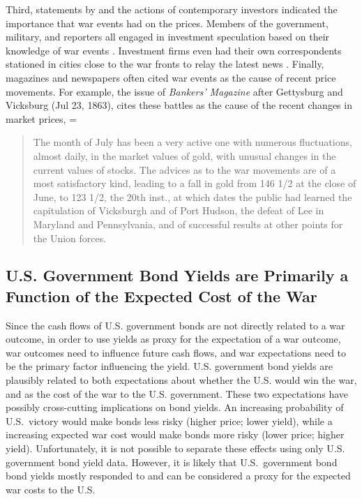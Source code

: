 Third, statements by and the actions of contemporary investors indicated the importance that war events had on the prices. %
Members of the government, military, and reporters all engaged in investment speculation based on their knowledge of war events \parencites[5-7]{Cornwallis1879}{Mitchell1903}[][1004]{WillardGuinnaneEtAl1996}.
Investment firms even had their own correspondents stationed in cities close to the war fronts to relay the latest news \parencites[5-7]{Cornwallis1879}. %
Finally, magazines and newspapers often cited war events as the cause of recent price movements. %
For example, the issue of \textit{Bankers' Magazine} after Gettysburg and Vicksburg (Jul 23, 1863), cites these battles as the cause of the recent changes in market prices,
=\begin{quote}
  The month of July has been a very active one with numerous fluctuations, almost daily, in the market values of gold, with unusual changes in the current values of stocks. %
  The advices as to the war movements are of a most satisfactory kind, leading to a fall in gold from 146 1/2 at the close of June, to 123 1/2, the 20th inst., at which dates the public had learned the  capitulation of Vicksburgh and of Port Hudson, the defeat of Lee in  Maryland and Pennsylvania, and of successful results at other points  for the Union forces. %
\parencite[159]{BankersMagazine1864}
\end{quote}



\subsection{U.S. Government Bond Yields are Primarily a Function of the Expected Cost of the War}
\label{sec:u.s.-governm-inter}

Since the cash flows of U.S. government bonds are not directly related to a war outcome, in order to use yields as proxy for the expectation of a war outcome, war outcomes need to influence future cash flows, and war expectations need to be the primary factor influencing the yield.
U.S. government bond yields are plausibly related to both expectations about whether the U.S. would win the war, and as the cost of the war to the U.S. government.
These two expectations have possibly cross-cutting implications on bond yields.
An increasing probability of U.S.\ victory would make bonds less risky (higher price; lower yield), while a increasing expected war cost would make bonds more risky (lower price; higher yield).
Unfortunately, it is not possible to separate these effects using only U.S. government bond yield data.
However, it is likely that U.S.\ government bond bond yields mostly responded to and can be considered a proxy for the expected war costs to the U.S.

